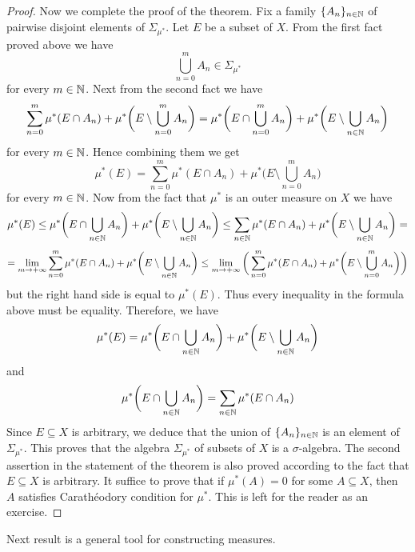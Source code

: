 \begin{proof}
    Now we complete the proof of the theorem. Fix a family $\{A_n\}_{n\in {\mathbb N}}$ of pairwise disjoint elements of $\Sigma_{\mu^*}$. Let $E$ be a subset of $X$. From the first fact proved above we have
    $$\bigcup_{n=0}^mA_n \in \Sigma_{\mu^*}$$
    for every $m\in {\mathbb N}$. Next from the second fact we have
    $$\sum_{n=0}^m\mu^*(E\cap A_n) + \mu^*\bigg(E\setminus \bigcup_{n=0}^mA_n\bigg) = \mu^*\bigg(E\cap \bigcup_{n=0}^mA_n\bigg) + \mu^*\bigg(E\setminus \bigcup_{n\in {\mathbb N}}A_n\bigg)$$
    for every $m\in {\mathbb N}$. Hence combining them we get
    $$\mu^*(E) = \sum_{n=0}^m\mu^*(E\cap A_n) + \mu^*\bigg(E\setminus \bigcup_{n=0}^mA_n\bigg)$$
    for every $m\in {\mathbb N}$. Now from the fact that $\mu^*$ is an outer measure on $X$ we have
    $$\mu^*(E) \leq \mu^*\bigg(E\cap \bigcup_{n\in {\mathbb N}}A_n\bigg) + \mu^*\bigg(E\setminus \bigcup_{n\in {\mathbb N}}A_n\bigg) \leq \sum_{n\in {\mathbb N}}\mu^*(E\cap A_n) + \mu^*\bigg(E\setminus \bigcup_{n\in {\mathbb N}}A_n\bigg) = $$
    $$= \lim_{m\rightarrow +\infty}\sum_{n=0}^m\mu^*(E\cap A_n) + \mu^*\bigg(E\setminus \bigcup_{n\in {\mathbb N}}A_n\bigg) \leq \lim_{m\rightarrow +\infty}\bigg(\sum_{n=0}^m\mu^*(E\cap A_n) + \mu^*\bigg(E\setminus \bigcup_{n=0}^mA_n\bigg)\bigg)$$
    but the right hand side is equal to $\mu^*(E)$. Thus every inequality in the formula above must be equality. Therefore, we have
    $$\mu^*(E) = \mu^*\bigg(E\cap \bigcup_{n\in {\mathbb N}}A_n\bigg) + \mu^*\bigg(E\setminus \bigcup_{n\in {\mathbb N}}A_n\bigg)$$
    and
    $$\mu^*\bigg(E\cap \bigcup_{n\in {\mathbb N}}A_n\bigg) = \sum_{n\in {\mathbb N}}\mu^*(E\cap A_n)$$
    Since $E\subseteq X$ is arbitrary, we deduce that the union of $\{A_n\}_{n\in {\mathbb N}}$ is an element of $\Sigma_{\mu^*}$. This proves that the algebra $\Sigma_{\mu^*}$ of subsets of $X$ is a $\sigma$-algebra. The second assertion in the statement of the theorem is also proved according to the fact that $E\subseteq X$ is arbitrary. It suffice to prove that if $\mu^*(A) = 0$ for some $A\subseteq X$, then $A$ satisfies Carath{\'e}odory condition for $\mu^*$. This is left for the reader as an exercise.
\end{proof}
\noindent
Next result is a general tool for constructing measures.

